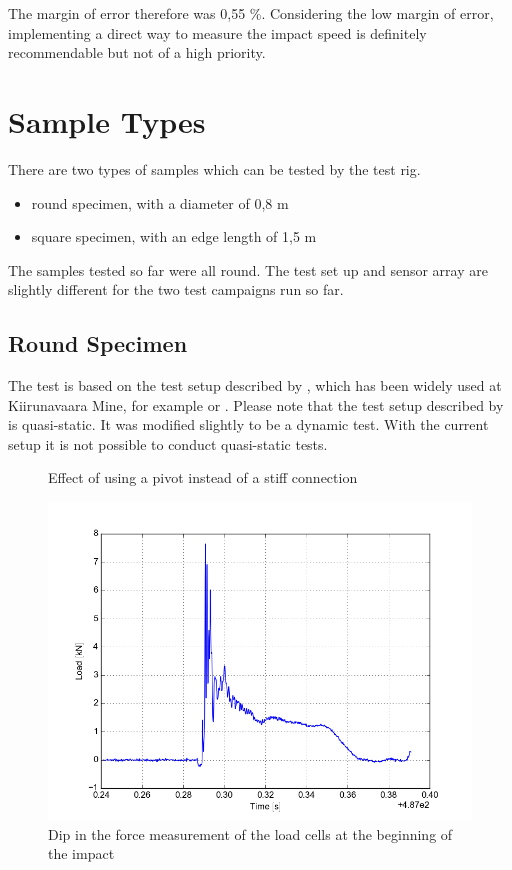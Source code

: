 The margin of error therefore was 0,55 \%. Considering the low margin of error, implementing a direct way to measure the impact speed is definitely recommendable but not of a high priority.

\section{Sample Types}

There are two types of samples which can be tested by the test rig. 

\begin{itemize}
    \item round specimen, with a diameter of 0,8 m
    \item square specimen, with an edge length of 1,5 m
\end{itemize}

The samples tested so far were all round. The test set up and sensor array are slightly different for the two test campaigns run so far. 

\subsection{Round Specimen}

The test is based on the test setup described by \textcite{c1550}, which has been widely used at Kiirunavaara Mine, for example \textcite{Thyni14} or \textcite{Erik15}. Please note that the test setup described by \textcite{c1550} is quasi-static. It was modified slightly to be a dynamic test. With the current setup it is not possible to conduct quasi-static tests. 

\begin{figure}
    \centering
    {
    
    }
    {
    
    }
    \caption{Effect of using a pivot instead of a stiff connection}
    \label{fig:pivot}
\end{figure}

\begin{figure}[p]
    \centering
    \includegraphics[width = 0.95 \linewidth]{pics/loadip.png}
    \caption{Dip in the force measurement of the load cells at the beginning of the impact}
    \label{fig:dip}
\end{figure}

